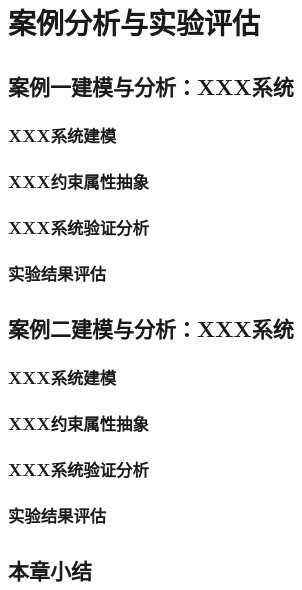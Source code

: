\chapter{案例分析与实验评估}
\label{ch6}


\section{案例一建模与分析：XXX系统}

\subsection{XXX系统建模}
\subsection{XXX约束属性抽象}
\subsection{XXX系统验证分析}
\subsection{实验结果评估}

\section{案例二建模与分析：XXX系统}

\subsection{XXX系统建模}
\subsection{XXX约束属性抽象}
\subsection{XXX系统验证分析}
\subsection{实验结果评估}


\section{本章小结}
